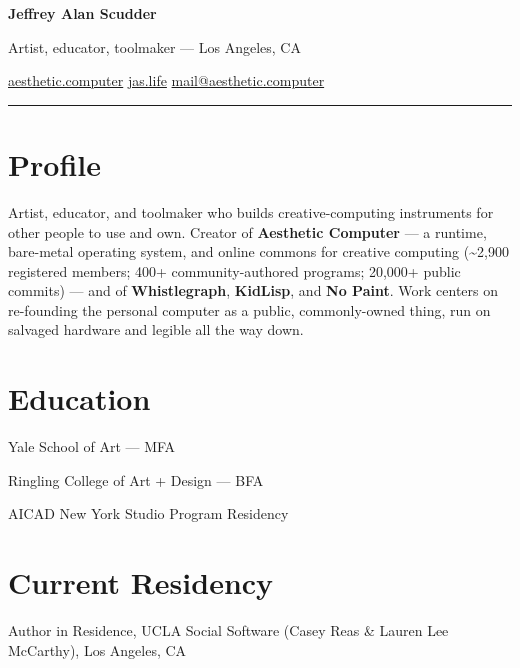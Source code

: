 \documentclass[10pt,letterpaper]{article}
\newlength{\cvyearwidth}
\newenvironment{cvlist}{%
  \begin{list}{}{%
    \setlength{\leftmargin}{\cvyearwidth}%
    \setlength{\labelwidth}{\cvyearwidth}%
    \setlength{\labelsep}{0.4em}%
    \setlength{\itemsep}{0.08em}%
    \setlength{\parsep}{0pt}%
    \setlength{\topsep}{0.15em}%
    \renewcommand{\makelabel}[1]{\color{acgray}\small ##1\hfill}%
  }%
}{\end{list}}
\newcommand{\cv}[2]{\item[#1] #2}
\begin{document}
\thispagestyle{firstpage}

\begin{center}
  {\fontsize{20pt}{22pt}\selectfont\color{acdark}\textbf{Jeffrey Alan Scudder}}\par
  \vspace{0.2em}
  {\small\color{acpink} Artist, educator, toolmaker --- Los Angeles, CA}\par
  \vspace{0.4em}
  {\small
    \href{https://aesthetic.computer}{aesthetic.computer} \; \textperiodcentered \;
    \href{https://jas.life}{jas.life} \; \textperiodcentered \;
    \href{mailto:mail@aesthetic.computer}{mail@aesthetic.computer}
  }\par
\end{center}

\vspace{0.3em}
{\color{acgray}\rule{\linewidth}{0.4pt}}
\vspace{0.2em}

\section*{Profile}
Artist, educator, and toolmaker who builds creative-computing instruments for
other people to use and own. Creator of \textbf{Aesthetic Computer} --- a
runtime, bare-metal operating system, and online commons for creative computing
(\textasciitilde2,900 registered members; 400+ community-authored programs;
20,000+ public commits) --- and of \textbf{Whistlegraph}, \textbf{KidLisp}, and
\textbf{No Paint}. Work centers on re-founding the personal computer as a public,
commonly-owned thing, run on salvaged hardware and legible all the way down.

\section*{Education}
\begin{cvlist}
  \cv{2013}{Yale School of Art --- MFA}
  \cv{2011}{Ringling College of Art + Design --- BFA}
  \cv{2010}{AICAD New York Studio Program Residency}
\end{cvlist}

\section*{Current Residency}
\begin{cvlist}
  \cv{2026}{Author in Residence, UCLA Social Software (Casey Reas \& Lauren Lee McCarthy), Los Angeles, CA}
\end{cvlist}
\end{document}
